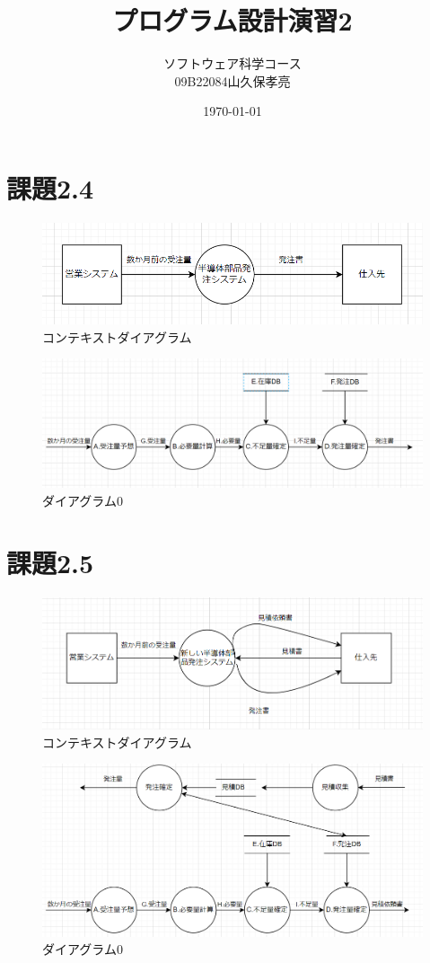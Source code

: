 \documentclass[dvipdfmx]{jarticle}
\title{プログラム設計演習2}
\author{ソフトウェア科学コース\\09B22084山久保孝亮}
\date{\today}
\begin{document}
\maketitle
\section{課題2.4}
\begin{figure}[h]
    \centering
    \includegraphics[width=cm]{2-4-1.png}
    \caption{コンテキストダイアグラム}
\end{figure}
\begin{figure}[h]
    \centering
    \includegraphics[width=12cm]{2-4-2.png}
    \caption{ダイアグラム0}
\end{figure}
\section{課題2.5}
\begin{figure}[h]
    \centering
    \includegraphics[width=12cm]{2-5-1.png}
    \caption{コンテキストダイアグラム}
\end{figure}
\begin{figure}[h]
    \centering
    \includegraphics[width=12cm]{2-5-2.png}
    \caption{ダイアグラム0}
\end{figure}
\end{document}
